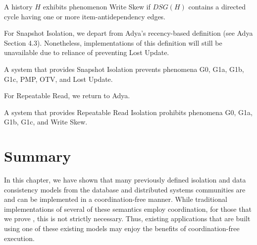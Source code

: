 \begin{definition}
A history $H$ exhibits phenomenon Write Skew if $DSG(H)$ contains a directed
cycle having one or more item-antidependency edges.
\end{definition}

For Snapshot Isolation, we depart from Adya's recency-based definition
(see Adya Section 4.3). Nonetheless, implementations of this
definition will still be unavailable due to reliance of preventing
Lost Update.

\begin{definition}
A system that provides Snapshot Isolation prevents phenomena G0, G1a,
G1b, G1c, PMP, OTV, and Lost Update.
\end{definition}

For Repeatable Read, we return to Adya.

\begin{definition}
A system that provides Repeatable Read Isolation prohibits phenomena
G0, G1a, G1b, G1c, and Write Skew.
\end{definition}

\section{Summary}
\label{sec:conclusion}

In this chapter, we have shown that many previously defined isolation
and data consistency models from the database and distributed systems
communities are \iconfluent and can be implemented in a
coordination-free manner. While traditional implementations of several
of these semantics employ coordination, for those that we prove
\iconfluent, this is not strictly necessary. Thus, existing
applications that are built using one of these existing models may
enjoy the benefits of coordination-free execution.
